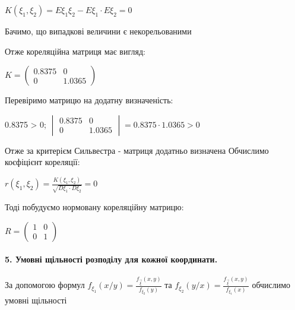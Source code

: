\documentclass[a4paper, 20pt, titlepage]{article}
\begin{document}
\begin{spacing}{1.4}
\vspace{4mm}

$K(\xi_1, \xi_2) = E \xi_1 \xi_2 - E \xi_1 \cdot E \xi_2 = 0$

\vspace{3mm}
Бачимо, що випадкові величини є некорельованими

Отже кореляційна матриця має вигляд:

 \begin{center}
$
K = 
\begin{pmatrix}
0.8375 & 0 \\
0 & 1.0365 
\end{pmatrix}
$
\end{center}

Перевіримо матрицю на додатну визначеність:

\begin{center}
0.8375 > 0; \quad \quad $
\begin{vmatrix}
0.8375 & 0 \\
0 & 1.0365
\end{vmatrix}
= 0.8375 \cdot  1.0365 > 0
$
\end{center}
Отже за критерієм Сильвестра - матриця додатньо визначена
Обчислимо коєфіцієнт кореляції:
\begin{center}
$
r(\xi_1,\xi_2) = \frac{K(\xi_1, \xi_2)}{\sqrt{D \xi_1\cdot D \xi_2}} = 0
$
\end{center}

Тоді побудуємо нормовану кореляційну матрицю:
 \begin{center}
$
R = 
\begin{pmatrix}
1& 0 \\
0 &1
\end {pmatrix}
$
\end{center}

\newpage{}

\paragraph{5. Умовні щільності розподілу для кожної координати. }
За допомогою формул  $f_{\xi_1}(x/y)=\frac{f_{\vec{\xi}}(x,y)}{f_{\xi_2}(y)}$ та $f_{\xi_2}(y/x)=\frac{f_{\vec{\xi}}(x,y)}{f_{\xi_1}(x)}$ обчислимо умовні щільності


\end{spacing}
\end{document}

